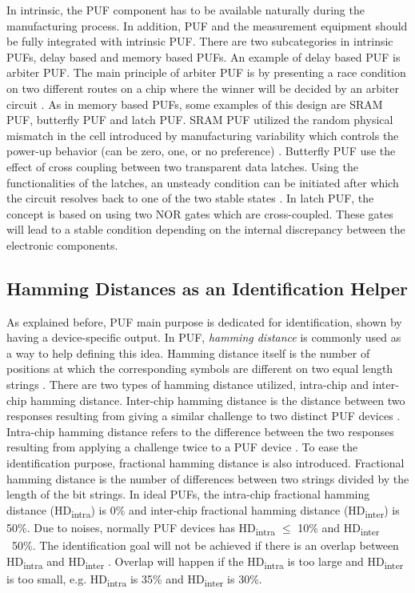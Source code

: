In intrinsic, the PUF component has to be available naturally during the manufacturing process. In addition, PUF and the measurement equipment should be fully integrated with intrinsic PUF. There are two subcategories in intrinsic PUFs, delay based and memory based PUFs. An example of delay based PUF is arbiter PUF. The main principle of arbiter PUF is by presenting a race condition on two different routes on a chip where the winner will be decided by an arbiter circuit \cite{study_of_the_art_puf}. As in memory based PUFs, some examples of this design are SRAM PUF, butterfly PUF and latch PUF. SRAM PUF utilized the random physical mismatch in the cell introduced by manufacturing variability which controls the power-up behavior (can be zero, one, or no preference) \cite{study_of_the_art_puf}. Butterfly PUF use the effect of cross coupling between two transparent data latches. Using the functionalities of the latches, an unsteady condition can be initiated after which the circuit resolves back to one of the two stable states \cite{study_of_the_art_puf}. In latch PUF, the concept is based on using two NOR gates which are cross-coupled. These gates will lead to a stable condition depending on the internal discrepancy between the electronic components.

\subsection{Hamming Distances as an Identification Helper}

As explained before, PUF main purpose is dedicated for identification, shown by having a device-specific output. In PUF, \textit{hamming distance} is commonly used as a way to help defining this idea. Hamming distance itself is the number of positions at which the corresponding symbols are different on two equal length strings \cite{hamming_distance}.
There are two types of hamming distance utilized, intra-chip and inter-chip hamming distance. Inter-chip hamming distance is the distance between two responses resulting from giving a similar challenge to two distinct PUF devices \cite{study_of_the_art_puf}. Intra-chip hamming distance refers to the difference between the two responses resulting from applying a challenge twice to a PUF device \cite{modeling_sram}. To ease the identification purpose, fractional hamming distance is also introduced. Fractional hamming distance is the number of differences between two strings divided by the length of the bit strings.
In ideal PUFs, the intra-chip fractional hamming distance (HD\textsubscript{intra}) is 0\% and inter-chip fractional hamming distance (HD\textsubscript{inter}) is 50\%. Due to noises, normally PUF devices has HD\textsubscript{intra} $\leq$ 10\% and HD\textsubscript{inter} ~50\%. The identification goal will not be achieved if there is an overlap between HD\textsubscript{intra} and HD\textsubscript{inter} \cite{impact_aging}. Overlap will happen if the HD\textsubscript{intra} is too large and HD\textsubscript{inter} is too small, e.g. HD\textsubscript{intra} is 35\% and HD\textsubscript{inter} is 30\%.

